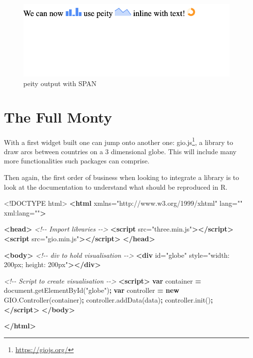 \documentclass[
]{krantz}
\makeatletter
\newenvironment{Shaded}{\begin{snugshade}}{\end{snugshade}}
\newcommand{\AttributeTok}[1]{\textcolor[rgb]{0.61,0.61,0.61}{#1}}
\newcommand{\CommentTok}[1]{\textcolor[rgb]{0.37,0.37,0.37}{\textit{#1}}}
\newcommand{\DataTypeTok}[1]{\textcolor[rgb]{0.27,0.27,0.27}{#1}}
\newcommand{\KeywordTok}[1]{\textcolor[rgb]{0.27,0.27,0.27}{\textbf{#1}}}
\newcommand{\NormalTok}[1]{#1}
\newcommand{\OperatorTok}[1]{\textcolor[rgb]{0.43,0.43,0.43}{\textbf{#1}}}
\newcommand{\OtherTok}[1]{\textcolor[rgb]{0.37,0.37,0.37}{#1}}
\newcommand{\StringTok}[1]{\textcolor[rgb]{0.5,0.5,0.5}{#1}}
\newcommand{\VariableTok}[1]{\textcolor[rgb]{0,0,0}{#1}}
\renewcommand{\href}[2]{#2\footnote{\url{#1}}}
\newenvironment{kframe}{%
\medskip{}
\setlength{\fboxsep}{.8em}
 \def\at@end@of@kframe{}%
 \ifinner\ifhmode%
  \def\at@end@of@kframe{\end{minipage}}%
  \begin{minipage}{\columnwidth}%
 \fi\fi%
 \def\FrameCommand##1{\hskip\@totalleftmargin \hskip-\fboxsep
 \colorbox{shadecolor}{##1}\hskip-\fboxsep
     \hskip-\linewidth \hskip-\@totalleftmargin \hskip\columnwidth}%
 \MakeFramed {\advance\hsize-\width
   \@totalleftmargin\z@ \linewidth\hsize
   \@setminipage}}%
 {\par\unskip\endMakeFramed%
 \at@end@of@kframe}
\renewenvironment{Shaded}{\begin{kframe}}{\end{kframe}}
\makeatother
\begin{document}
\begin{figure}
\centering
\includegraphics{images/peity-span.png}
\caption{peity output with SPAN}
\end{figure}

\hypertarget{widgets-full}{%
\chapter{The Full Monty}\label{widgets-full}}

With a first widget built one can jump onto another one: \href{https://giojs.org/}{gio.js}, a library to draw arcs between countries on a 3 dimensional globe. This will include many more functionalities such packages can comprise.

Then again, the first order of business when looking to integrate a library is to look at the documentation to understand what should be reproduced in R.

\begin{Shaded}
\begin{Highlighting}[]
\DataTypeTok{<!DOCTYPE }\NormalTok{html}\DataTypeTok{>}
\KeywordTok{<html}\OtherTok{ xmlns=}\StringTok{"http://www.w3.org/1999/xhtml"}\OtherTok{ lang=}\StringTok{""}\OtherTok{ xml:lang=}\StringTok{""}\KeywordTok{>}

\KeywordTok{<head>}
  \CommentTok{<!{-}{-} Import libraries {-}{-}>}
  \KeywordTok{<script}\OtherTok{ src=}\StringTok{"three.min.js"}\KeywordTok{></script>}
  \KeywordTok{<script}\OtherTok{ src=}\StringTok{"gio.min.js"}\KeywordTok{></script>}
\KeywordTok{</head>}

\KeywordTok{<body>}
  \CommentTok{<!{-}{-} div to hold visualisation {-}{-}>}
  \KeywordTok{<div}\OtherTok{ id=}\StringTok{"globe"}\OtherTok{ style=}\StringTok{"width: 200px; height: 200px"}\KeywordTok{></div>}

  \CommentTok{<!{-}{-} Script to create visualisation {-}{-}>}
  \KeywordTok{<script>}
    \KeywordTok{var}\NormalTok{ container }\OperatorTok{=} \VariableTok{document}\NormalTok{.}\AttributeTok{getElementById}\NormalTok{(}\StringTok{"globe"}\NormalTok{)}\OperatorTok{;}
    \KeywordTok{var}\NormalTok{ controller }\OperatorTok{=} \KeywordTok{new} \VariableTok{GIO}\NormalTok{.}\AttributeTok{Controller}\NormalTok{(container)}\OperatorTok{;}
    \VariableTok{controller}\NormalTok{.}\AttributeTok{addData}\NormalTok{(data)}\OperatorTok{;}
    \VariableTok{controller}\NormalTok{.}\AttributeTok{init}\NormalTok{()}\OperatorTok{;}
  \KeywordTok{</script>}
\KeywordTok{</body>}

\KeywordTok{</html>}
\end{Highlighting}
\end{Shaded}
\end{document}
